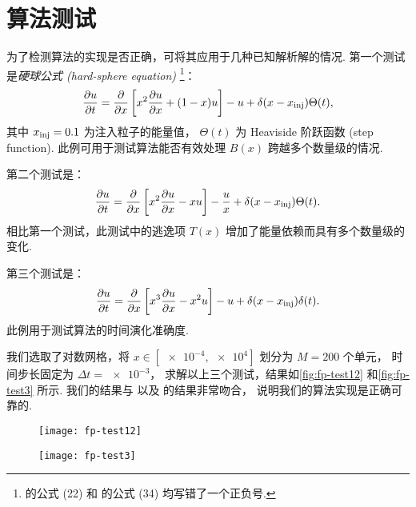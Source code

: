\section{算法测试}

为了检测算法的实现是否正确，可将其应用于几种已知解析解的情况\cite{park1996,donnert2014}.
第一个测试是\emph{硬球公式 (hard-sphere equation)}%
\footnote{ 的公式 (22) 和  的公式 (34)
均写错了一个正负号.}：
\begin{equation}
  \label{eq:fp-test1}
  \frac{\partial u}{\partial t} = \frac{\partial }{\partial x} \left[ x^2 \frac{\partial u}{\partial x} + (1-x) u \right]
    - u + \delta(x-x_{\mathrm{inj}}) \Theta(t) ,
\end{equation}
其中 $x_{\mathrm{inj}} = 0.1$ 为注入粒子的能量值，
$\Theta(t)$ 为 Heaviside 阶跃函数 (step function).
此例可用于测试算法能否有效处理 $B(x)$ 跨越多个数量级的情况.

第二个测试是：
\begin{equation}
  \label{eq:fp-test2}
  \frac{\partial u}{\partial t} = \frac{\partial }{\partial x} \left[ x^2 \frac{\partial u}{\partial x} - x u \right]
    - \frac{u}{x} + \delta(x-x_{\mathrm{inj}}) \Theta(t) .
\end{equation}
相比第一个测试，此测试中的逃逸项 $T(x)$ 增加了能量依赖而具有多个数量级的变化.

第三个测试是：
\begin{equation}
  \label{eq:fp-test3}
  \frac{\partial u}{\partial t} = \frac{\partial }{\partial x} \left[ x^3 \frac{\partial u}{\partial x} - x^2 u \right]
    - u + \delta(x-x_{\mathrm{inj}}) \delta(t) .
\end{equation}
此例用于测试算法的时间演化准确度.

我们选取了对数网格，将 $x \in [\num{e-4}, \num{e4}]$ 划分为 $M=200$ 个单元，
时间步长固定为 $\Delta t = \num{e-3}$，
求解以上三个测试，结果如\autoref{fig:fp-test12} 和\autoref{fig:fp-test3} 所示.
我们的结果与  以及  的结果非常吻合，
说明我们的算法实现是正确可靠的.

\begin{figure}[!htp]
  \centering
  \texttt{[image: fp-test12]}
  \label{fig:fp-test12}
\end{figure}

\begin{figure}[!htp]
  \centering
  \texttt{[image: fp-test3]}
  \label{fig:fp-test3}
\end{figure}



